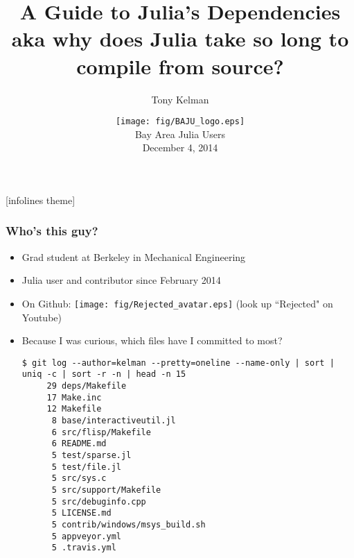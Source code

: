 \documentclass[compressed,dvips,letter]{beamer}
\title[A Guide to Julia's Dependencies]
{A Guide to Julia's Dependencies\\
\vspace{5pt}
\small aka why does Julia take so long to compile from source?}
\author{Tony Kelman}
\institute[{\fontfamily{pcr}\selectfont @tkelman}]
{
  \footnotesize ({\fontfamily{pcr}\selectfont @tkelman} on Github)
}
\date[BAJU, Dec 4 2014]{\texttt{[image: fig/BAJU\_logo.eps]}
\\Bay Area Julia Users\\December 4, 2014}
\begin{document}

\begin{frame}
  \titlepage
\end{frame}


%
%
\setcounter{framenumber}{0}
[infolines theme]



\begin{frame}[fragile]\frametitle{Who's this guy?}
\begin{itemize}
  \item Grad student at Berkeley in Mechanical Engineering
  \item Julia user and contributor since February 2014
  \item On Github: \texttt{[image: fig/Rejected\_avatar.eps]} {\tiny (look up ``Rejected" on Youtube)}
  \item Because I was curious, which files have I committed to most?
  
  \tiny \begin{verbatim}
$ git log --author=kelman --pretty=oneline --name-only | sort | uniq -c | sort -r -n | head -n 15
     29 deps/Makefile
     17 Make.inc
     12 Makefile
      8 base/interactiveutil.jl
      6 src/flisp/Makefile
      6 README.md
      5 test/sparse.jl
      5 test/file.jl
      5 src/sys.c
      5 src/support/Makefile
      5 src/debuginfo.cpp
      5 LICENSE.md
      5 contrib/windows/msys_build.sh
      5 appveyor.yml
      5 .travis.yml
  \end{verbatim}

\end{itemize}

\end{frame}
%
%
\end{document}
